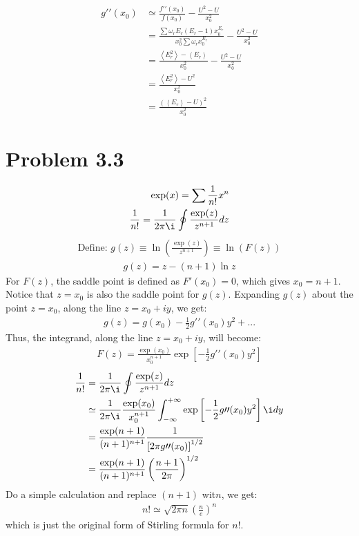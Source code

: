 \documentclass{article}
\begin{document}
    \begin{align}
    g\prime\prime(x_0)&\simeq\frac{f\prime\prime(x_0)}{f(x_0)}-\frac{U^2-U}{x_0^2}\\
    &=\frac{\sum\omega_r E_r(E_r-1)x_0^{E_r}}{x_0^2 \sum\omega_r x_0^{E_r}}-\frac{U^2-U}{x_0^2}\\
    &=\frac{\left<E_r^2\right>-\left<E_r\right>}{x_0^2} -\frac{U^2-U}{x_0^2}\\
    &=\frac{\left<E_r^2\right>-U^2}{x_0^2}\\
    &=\frac{\left(\left<E_r\right>-U\right)^2}{x_0^2}
    \end{align}


\section*{Problem 3.3}

    \begin{align}
    \exp(x)=\sum \frac{1}{n!}x^n\\
    \frac{1}{n!}=\frac{1}{2\pi\i} \oint \frac{\exp(z)}{z^{n+1}}dz
    \end{align}
    \begin{align}
    \text{Define: }
    g(z)\equiv \ln{(\frac{\exp(z)}{z^{n+1}})}\equiv \ln (F(z))
    \end{align}
    \begin{align}
    g(z)=z-(n+1)\ln z
    \end{align}
For $F(z)$, the saddle point is defined as $F\prime(x_0)=0$, which gives $x_0=n+1$. Notice that $z=x_0$ is also the saddle point for $g(z)$. Expanding $g(z)$ about the point $z=x_0$, along the line $z=x_0+iy$, we get:
    \begin{align}
    g(z)=g(x_0)-\frac{1}{2}g \prime \prime(x_0)y^2+...
    \end{align}
Thus, the integrand, along the line $z=x_0+iy$, will become:
    \begin{align}
    F(z)=\frac{\exp(x_0)}{x_0^{n+1}} \exp \left[  -\frac{1}{2}g \prime \prime(x_0)y^2  \right]
    \end{align}
    \begin{align}
    \frac{1}{n!}&=\frac{1}{2\pi\i} \oint \frac{\exp(z)}{z^{n+1}}dz\\
    &\simeq \frac{1}{2\pi\i} \frac{\exp(x_0)}{x_0^{n+1}} \int_{-\infty}^{+\infty} \exp \left[  -\frac{1}{2}g \prime \prime(x_0)y^2  \right] \i dy\\
    &=\frac{\exp(n+1)}{(n+1)^{n+1}} \frac{1}{ \left[2\pi g \prime \prime(x_0)\right]^{1/2}}\\
    &=\frac{\exp(n+1)}{(n+1)^{n+1}} \left(\frac{n+1}{2\pi}\right)^{1/2}
    \end{align}
Do a simple calculation and replace $(n+1)$ wit$n$, we get:
    \begin{align}
    n! \simeq \sqrt{2\pi n} \left( \frac{n}{e} \right)^n
    \end{align}
which is just the original form of Stirling formula for $n!$.
\end{document}
